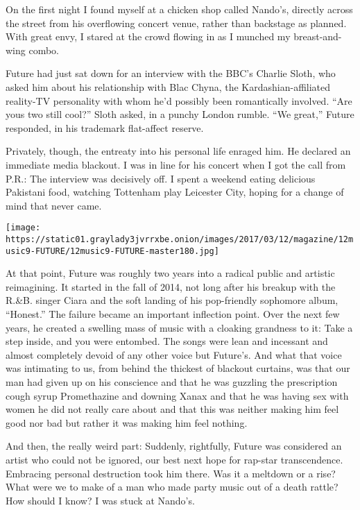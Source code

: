 On the first night I found myself at a chicken shop called Nando's,
directly across the street from his overflowing concert venue, rather
than backstage as planned. With great envy, I stared at the crowd
flowing in as I munched my breast-and-wing combo.

Future had just sat down for an interview with the BBC's Charlie Sloth,
who asked him about his relationship with Blac Chyna, the
Kardashian-affiliated reality-TV personality with whom he'd possibly
been romantically involved. ``Are yous two still cool?'' Sloth asked, in
a punchy London rumble. ``We great,'' Future responded, in his trademark
flat-affect reserve.

Privately, though, the entreaty into his personal life enraged him. He
declared an immediate media blackout. I was in line for his concert when
I got the call from P.R.: The interview was decisively off. I spent a
weekend eating delicious Pakistani food, watching Tottenham play
Leicester City, hoping for a change of mind that never came.

\texttt{[image: https://static01.graylady3jvrrxbe.onion/images/2017/03/12/magazine/12music9-FUTURE/12music9-FUTURE-master180.jpg]}

At that point, Future was roughly two years into a radical public and
artistic reimagining. It started in the fall of 2014, not long after his
breakup with the R.\&B. singer Ciara and the soft landing of his
pop-friendly sophomore album, ``Honest.'' The failure became an
important inflection point. Over the next few years, he created a
swelling mass of music with a cloaking grandness to it: Take a step
inside, and you were entombed. The songs were lean and incessant and
almost completely devoid of any other voice but Future's. And what that
voice was intimating to us, from behind the thickest of blackout
curtains, was that our man had given up on his conscience and that he
was guzzling the prescription cough syrup Promethazine and downing Xanax
and that he was having sex with women he did not really care about and
that this was neither making him feel good nor bad but rather it was
making him feel nothing.

And then, the really weird part: Suddenly, rightfully, Future was
considered an artist who could not be ignored, our best next hope for
rap-star transcendence. Embracing personal destruction took him there.
Was it a meltdown or a rise? What were we to make of a man who made
party music out of a death rattle? How should I know? I was stuck at
Nando's.

